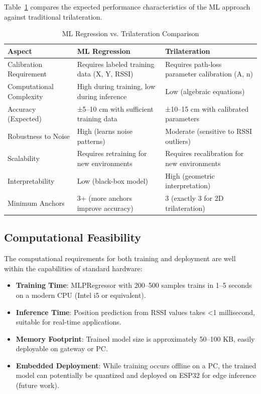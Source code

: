 Table~\ref{tab:ml_vs_trilateration} compares the expected performance characteristics of the ML approach against traditional trilateration.

\begin{table}[H]
\centering
\caption{ML Regression vs. Trilateration Comparison}
\label{tab:ml_vs_trilateration}
\begin{tabular}{|p{4cm}|p{5cm}|p{5cm}|}
\hline
\textbf{Aspect} & \textbf{ML Regression} & \textbf{Trilateration} \\
\hline
Calibration Requirement & Requires labeled training data (X, Y, RSSI) & Requires path-loss parameter calibration (A, n) \\
\hline
Computational Complexity & High during training, low during inference & Low (algebraic equations) \\
\hline
Accuracy (Expected) & ±5--10 cm with sufficient training data & ±10--15 cm with calibrated parameters \\
\hline
Robustness to Noise & High (learns noise patterns) & Moderate (sensitive to RSSI outliers) \\
\hline
Scalability & Requires retraining for new environments & Requires recalibration for new environments \\
\hline
Interpretability & Low (black-box model) & High (geometric interpretation) \\
\hline
Minimum Anchors & 3+ (more anchors improve accuracy) & 3 (exactly 3 for 2D trilateration) \\
\hline
\end{tabular}
\end{table}

\subsection{Computational Feasibility}

The computational requirements for both training and deployment are well within the capabilities of standard hardware:

\begin{itemize}
    \item \textbf{Training Time}: MLPRegressor with 200--500 samples trains in 1--5 seconds on a modern CPU (Intel i5 or equivalent).
    \item \textbf{Inference Time}: Position prediction from RSSI values takes <1 millisecond, suitable for real-time applications.
    \item \textbf{Memory Footprint}: Trained model size is approximately 50--100 KB, easily deployable on gateway or PC.
    \item \textbf{Embedded Deployment}: While training occurs offline on a PC, the trained model can potentially be quantized and deployed on ESP32 for edge inference (future work).
\end{itemize}

